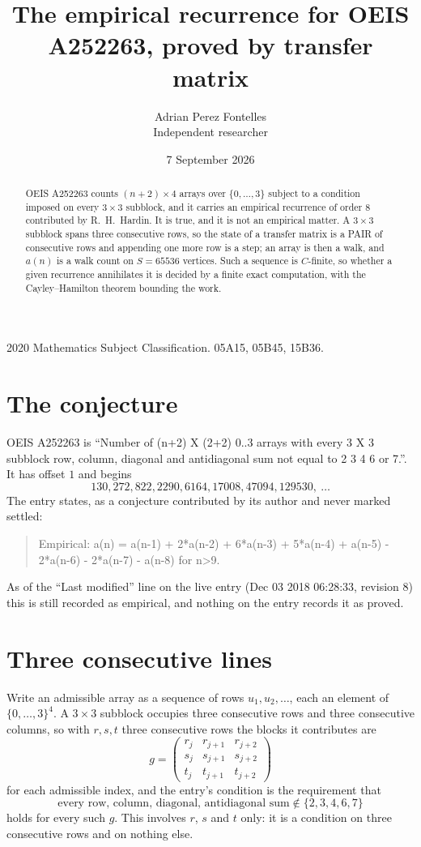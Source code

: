\documentclass[11pt,a4paper]{article}
\title{The empirical recurrence for OEIS A252263, proved by transfer matrix}
\author{Adrian Perez Fontelles\\ \small Independent researcher}
\date{7 September 2026}
\theoremstyle{plain}
\theoremstyle{definition}
\begin{document}
\maketitle

\begin{abstract}
OEIS A252263 counts $(n+2)\times4$ arrays over $\{0,\dots,3\}$ subject to a condition imposed on
every $3\times3$ subblock, and it carries an empirical recurrence of order $8$
contributed by R.~H.~Hardin. It is true, and it is not an empirical matter. A $3\times3$
subblock spans three consecutive rows, so the state of a transfer matrix is a PAIR of
consecutive rows and appending one more row is a step; an array is then a walk, and
$a(n)$ is a walk count on $S=65536$ vertices. Such a sequence is $C$-finite, so whether a given
recurrence annihilates it is decided by a finite exact computation, with the Cayley--Hamilton
theorem bounding the work.
\end{abstract}

\noindent\small 2020 Mathematics Subject Classification. 05A15, 05B45, 15B36.\normalsize

\section{The conjecture}

OEIS A252263 is ``Number of (n+2) X (2+2) 0..3 arrays with every 3 X 3 subblock row, column, diagonal and antidiagonal sum not equal to 2 3 4 6 or 7.''. It has offset $1$ and begins
\[
130, 272, 822, 2290, 6164, 17008, 47094, 129530,\ \dots
\]
The entry states, as a conjecture contributed by its author and never marked settled:
\begin{quote}
Empirical: a(n) = a(n-1) + 2*a(n-2) + 6*a(n-3) + 5*a(n-4) + a(n-5) - 2*a(n-6) - 2*a(n-7) - a(n-8) for n>9.
\end{quote}
As of the ``Last modified'' line on the live entry (Dec 03 2018 06:28:33, revision 8) this is still
recorded as empirical, and nothing on the entry records it as proved.

\section{Three consecutive lines}

Write an admissible array as a sequence of rows $u_1,u_2,\dots$, each an element of
$\{0,\dots,3\}^{4}$. A $3\times3$ subblock occupies three consecutive rows and
three consecutive columns, so with $r,s,t$ three consecutive rows the blocks it
contributes are
\[
g=\begin{pmatrix}r_j&r_{j+1}&r_{j+2}\\ s_j&s_{j+1}&s_{j+2}\\ t_j&t_{j+1}&t_{j+2}\end{pmatrix}
\]
for each admissible index, and the entry's condition is the requirement that
\[
\text{every row, column, diagonal, antidiagonal sum} \notin \{2,3,4,6,7\}
\]
holds for every such $g$. This involves $r$, $s$ and $t$ only: it is a condition on
three consecutive rows and on nothing else.
\end{document}
